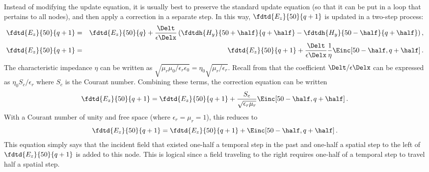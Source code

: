Instead of modifying the update equation, it is usually best to
preserve the standard update equation (so that it can be put in a loop
that pertains to all nodes), and then apply a correction in a separate
step.  In this way, $\fdtd{E_z}{50}{q+1}$ is updated in a two-step
process:
\begin{eqnarray}
  \fdtd{E_z}{50}{q+1} &=& \fdtd{E_z}{50}{q} + 
  \frac{\Delt}{\epsilon\Delx}
   \left(\fdtdh{H_y}{50+\half}{q+\half} -
         \fdtdh{H_y}{50-\half}{q+\half}\right), \\
  \fdtd{E_z}{50}{q+1} &=& \fdtd{E_z}{50}{q+1} + 
    \frac{\Delt}{\epsilon\Delx}
    \frac{1}{\eta}\Einc\!\left[50-\half,q+\half\right]. \label{eq:correction}
\end{eqnarray}
The characteristic impedance $\eta$ can be written as
$\sqrt{\mu_r\mu_0/\epsilon_r\epsilon_0}=
\eta_0\sqrt{\mu_r/\epsilon_r}$.  Recall from  that
the coefficient $\Delt/\epsilon\Delx$ can be expressed as $\eta_0
S_c/\epsilon_r$ where $S_c$ is the Courant number.  Combining these
terms, the correction equation  can be written
\begin{equation}
  \fdtd{E_z}{50}{q+1} = \fdtd{E_z}{50}{q+1} + 
    \frac{S_c}{\sqrt{\epsilon_r\mu_r}}\Einc\!\left[50-\half,q+\half\right].
  \label{eq:correctionI}
\end{equation}
With a Courant number of unity and free space (where
$\epsilon_r=\mu_r=1$), this reduces to
\begin{equation}
  \fdtd{E_z}{50}{q+1} = \fdtd{E_z}{50}{q+1} +
  \Einc\!\left[50-\half,q+\half\right]. \label{eq:correctionII} 
\end{equation}
This equation simply says that the incident field that existed
one-half a temporal step in the past and one-half a spatial step to
the left of $\fdtd{E_z}{50}{q+1}$ is added to this node.  This is
logical since a field traveling to the right requires one-half of a
temporal step to travel half a spatial step.

